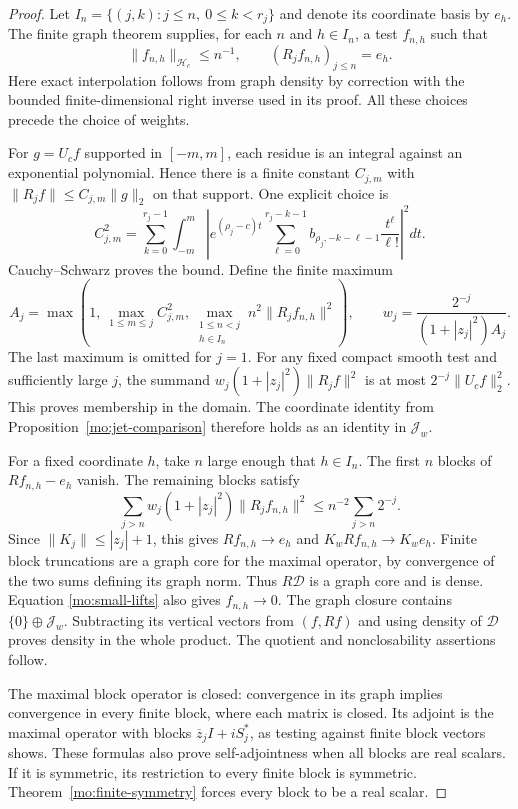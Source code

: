 \begin{proof}
Let $I_n=\{(j,k):j\leq n,\ 0\leq k<r_j\}$ and denote its
coordinate basis by $e_h$. The finite graph theorem supplies,
for each $n$ and $h\in I_n$, a test $f_{n,h}$ such that
\begin{equation}
 \|f_{n,h}\|_{\mathscr H_c}\leq n^{-1},\qquad
 (R_jf_{n,h})_{j\leq n}=e_h.
 \label{mo:small-lifts}
\end{equation}
Here exact interpolation follows from graph density by correction
with the bounded finite-dimensional right inverse used in its proof.
All these choices precede the choice of weights.

For $g=U_cf$ supported in $[-m,m]$, each residue is an integral
against an exponential polynomial. Hence there is a finite
constant $C_{j,m}$ with
$\|R_jf\|\leq C_{j,m}\|g\|_2$ on that support.
One explicit choice is
\[
 C_{j,m}^2=\sum_{k=0}^{r_j-1}\int_{-m}^m
 \left|e^{(\rho_j-c)t}
 \sum_{\ell=0}^{r_j-k-1}
 b_{\rho_j,-k-\ell-1}\frac{t^\ell}{\ell!}\right|^2dt.
\]
Cauchy--Schwarz proves the bound. Define the finite maximum
\[
 A_j=\max\left(
 1,\ \max_{1\leq m\leq j}C_{j,m}^2,
 \max_{\substack{1\leq n<j\\h\in I_n}}
                  n^2\|R_jf_{n,h}\|^2\right),
 \qquad
 w_j=\frac{2^{-j}}{(1+|z_j|^2)A_j}.
\]
The last maximum is omitted for $j=1$.
For any fixed compact smooth test and sufficiently large $j$,
the summand $w_j(1+|z_j|^2)\|R_jf\|^2$ is at most
$2^{-j}\|U_cf\|_2^2$. This proves membership in the domain.
The coordinate identity from Proposition~\ref{mo:jet-comparison} therefore
holds as an identity in $\mathscr J_w$.

For a fixed coordinate $h$, take $n$ large enough that $h\in I_n$.
The first $n$ blocks of $Rf_{n,h}-e_h$ vanish. The remaining
blocks satisfy
\[
 \sum_{j>n}w_j(1+|z_j|^2)\|R_jf_{n,h}\|^2
 \leq n^{-2}\sum_{j>n}2^{-j}.
\]
Since $\|K_j\|\leq |z_j|+1$, this gives
$Rf_{n,h}\to e_h$ and $K_wRf_{n,h}\to K_we_h$.
Finite block truncations are a graph core for the maximal operator,
by convergence of the two sums defining its graph norm.
Thus $R\mathscr D$ is a graph core and is dense.
Equation \eqref{mo:small-lifts} also gives $f_{n,h}\to0$.
The graph closure contains $\{0\}\oplus\mathscr J_w$.
Subtracting its vertical vectors from $(f,Rf)$ and using density
of $\mathscr D$ proves density in the whole product.
The quotient and nonclosability assertions follow.

The maximal block operator is closed: convergence in its graph
implies convergence in every finite block, where each matrix is
closed. Its adjoint is the maximal operator with blocks
$\overline z_jI+iS_j^*$, as testing against finite block vectors
shows. These formulas also prove self-adjointness when all blocks
are real scalars. If it is symmetric, its restriction to every
finite block is symmetric. Theorem~\ref{mo:finite-symmetry} forces every
block to be a real scalar.


\end{proof}
